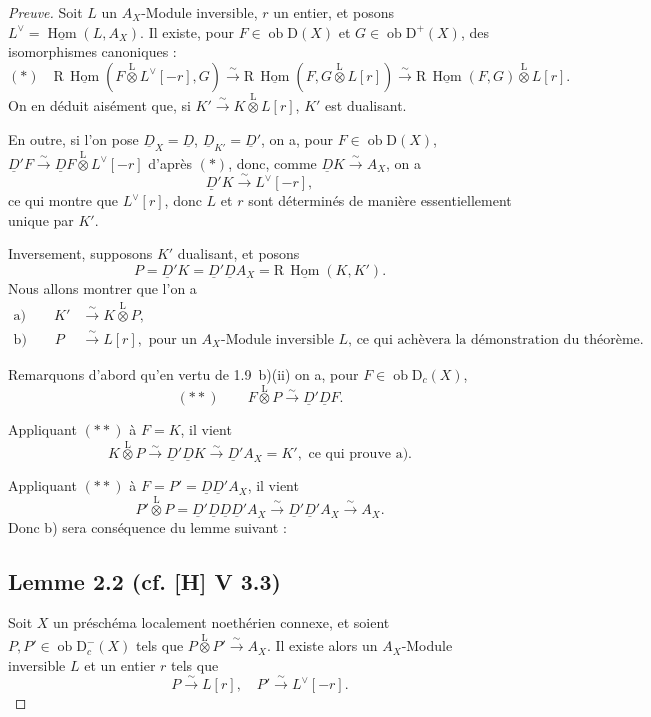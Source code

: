 \documentclass[11pt]{article}
\DeclareMathOperator{\Hom}{Hom}
\newcommand{\R}{\mathrm{R}}
\newcommand{\D}{\mathrm{D}}
\newcommand{\ob}{\operatorname{ob}}
\providecommand{\Hom}{\operatorname{Hom}}
\providecommand{\ob}{\operatorname{ob}}
\providecommand{\R}{\mathrm R}
\begin{document}
\begin{proof}[Preuve]
Soit $L$ un $A_X$-Module inversible, $r$ un entier, et posons $L^{\vee} = \underline{\Hom}(L, A_X)$. Il existe, pour $F \in \ob \D(X)$ et $G \in \ob \D^{+}(X)$, des isomorphismes canoniques :
\[
(*) \quad \R\,\underline{\Hom}(F \mathop{\otimes}\limits^{\mathrm{L}} L^{\vee}[-r], G) \xrightarrow{\sim} \R\,\underline{\Hom}(F, G \mathop{\otimes}\limits^{\mathrm{L}} L[r]) \xrightarrow{\sim} \R\,\underline{\Hom}(F,G) \mathop{\otimes}\limits^{\mathrm{L}} L[r].
\]
On en déduit aisément que, si $K' \xrightarrow{\sim} K \mathop{\otimes}\limits^{\mathrm{L}} L[r]$, $K'$ est dualisant.

En outre, si l'on pose $\underline{D}_X = \underline{D}$, $\underline{D}_{K'} = \underline{D}'$, on a, pour $F \in \ob \D(X)$, $\underline{D}'F \xrightarrow{\sim} \underline{D} F \mathop{\otimes}\limits^{\mathrm{L}} L^{\vee}[-r]$ d'après $(*)$, donc, comme $\underline{D} K \xrightarrow{\sim} A_X$, on a
\[
\underline{D}' K \xrightarrow{\sim} L^{\vee}[-r],
\]
ce qui montre que $L^{\vee}[r]$, donc $L$ et $r$ sont déterminés de manière essentiellement unique par $K'$.

Inversement, supposons $K'$ dualisant, et posons
\[
P = \underline{D}'K = \underline{D}'\underline{D} A_X = \R\,\underline{\Hom}(K,K').
\]
Nous allons montrer que l'on a
\begin{align*}
\text{a)} \qquad K' &\xrightarrow{\sim} K \mathop{\otimes}\limits^{\mathrm{L}} P, \\
\text{b)} \qquad P &\xrightarrow{\sim} L[r], \text{ pour un $A_X$-Module inversible $L$, ce qui achèvera la démonstration du théorème.}
\end{align*}

Remarquons d'abord qu'en vertu de 1.9~b)(ii) on a, pour $F \in \ob \D_c(X)$,
\[
(**) \qquad F \mathop{\otimes}\limits^{\mathrm{L}} P \xrightarrow{\sim} \underline{D}'\underline{D} F.
\]

Appliquant $(**)$ à $F = K$, il vient
\[
K \mathop{\otimes}\limits^{\mathrm{L}} P \xrightarrow{\sim} \underline{D}'\underline{D} K \xrightarrow{\sim} \underline{D}' A_X = K', \text{ ce qui prouve a).}
\]

Appliquant $(**)$ à $F = P' = \underline{D}\underline{D}'A_X$, il vient
\[
P' \mathop{\otimes}\limits^{\mathrm{L}} P = \underline{D}'\underline{D}\underline{D}\underline{D}'A_X \xrightarrow{\sim} \underline{D}'\underline{D}'A_X \xrightarrow{\sim} A_X.
\]
Donc b) sera conséquence du lemme suivant :

\subsection*{Lemme 2.2 (cf. [H] V 3.3)}
Soit $X$ un préschéma localement noethérien connexe, et soient $P, P' \in \ob \D_c^{-}(X)$ tels que $P \mathop{\otimes}\limits^{\mathrm{L}} P' \xrightarrow{\sim} A_X$. Il existe alors un $A_X$-Module inversible $L$ et un entier $r$ tels que
\[
P \xrightarrow{\sim} L[r], \quad P' \xrightarrow{\sim} L^{\vee}[-r].
\]


\end{proof}
\end{document}

